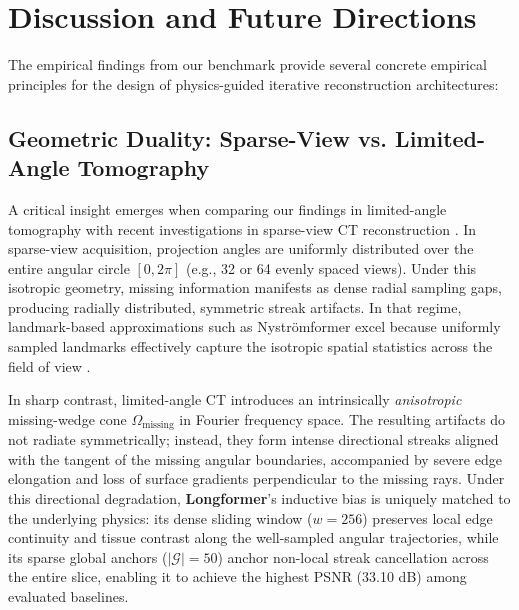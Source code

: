 \documentclass[runningheads]{llncs}
\begin{document}
\section{Discussion and Future Directions}
\label{sec:discussion}

The empirical findings from our benchmark provide several concrete empirical principles for the design of physics-guided iterative reconstruction architectures:

\subsection{Geometric Duality: Sparse-View vs. Limited-Angle Tomography}
A critical insight emerges when comparing our findings in limited-angle tomography with recent investigations in sparse-view CT reconstruction \cite{bui2026mva}. In sparse-view acquisition, projection angles are uniformly distributed over the entire angular circle $[0, 2\pi]$ (e.g., 32 or 64 evenly spaced views). Under this isotropic geometry, missing information manifests as dense radial sampling gaps, producing radially distributed, symmetric streak artifacts. In that regime, landmark-based approximations such as Nystr{\"o}mformer \cite{xiong2021nystromformer} excel because uniformly sampled landmarks effectively capture the isotropic spatial statistics across the field of view \cite{bui2026mva}.

In sharp contrast, limited-angle CT introduces an intrinsically \textit{anisotropic} missing-wedge cone $\Omega_{\text{missing}}$ in Fourier frequency space. The resulting artifacts do not radiate symmetrically; instead, they form intense directional streaks aligned with the tangent of the missing angular boundaries, accompanied by severe edge elongation and loss of surface gradients perpendicular to the missing rays. Under this directional degradation, \textbf{Longformer}'s inductive bias is uniquely matched to the underlying physics: its dense sliding window ($w = 256$) preserves local edge continuity and tissue contrast along the well-sampled angular trajectories, while its sparse global anchors ($|\mathcal{G}| = 50$) anchor non-local streak cancellation across the entire slice, enabling it to achieve the highest PSNR (33.10 dB) among evaluated baselines.
\end{document}
